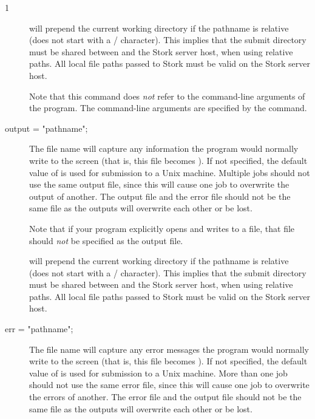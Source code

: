\begin{ManPage}{\label{man-stork-submit}}{1}
\begin{description}
 will prepend the current working directory if the pathname is
relative (does not start with a / character).  This implies that the submit
directory must be shared between  and the Stork server host, when
using relative paths.  All local file paths passed to Stork must be valid on
the Stork server host.

Note that this command does \emph{not} refer to the command-line
arguments of the program.  The command-line arguments are specified by
the  command.


\item[output = "\lt{}pathname\gt{}";]
The  file name will capture
any information the program would normally write to the screen
(that is, this file becomes ).
If not specified, the default value of
 is used for submission to a Unix machine.
Multiple jobs should not use the same output
file, since this will cause one job to overwrite the output of
another.
The output file and the error file should not be the same file
as the outputs will overwrite each other or be lost.

Note that if your program explicitly opens and writes to a file,
that file should \emph{not} be specified as the output file.

 will prepend the current working directory if the pathname is
relative (does not start with a / character).  This implies that the submit
directory must be shared between  and the Stork server host, when
using relative paths.  All local file paths passed to Stork must be valid on
the Stork server host.


\item[err = "\lt{}pathname\gt{}";]
The  file name will capture any
error messages the program would normally write to the screen
(that is, this file becomes ).
If not specified, the default value of
 is used for submission to a Unix machine.
More than one job should not use the same error file, since
this will cause one job to overwrite the errors of another.
The error file and the output file should not be the same file
as the outputs will overwrite each other or be lost.


\end{description}
\end{ManPage}
